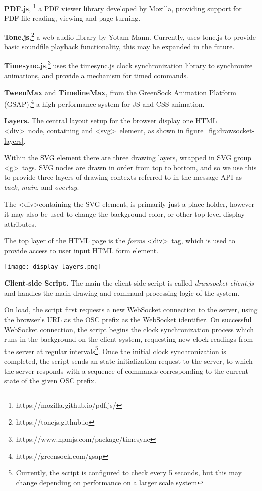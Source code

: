 \textbf{PDF.js}, \footnote{https://mozilla.github.io/pdf.js/} a PDF viewer library developed by Mozilla, providing support for PDF file reading, viewing and page turning.

\textbf{Tone.js},\footnote{https://tonejs.github.io} a web-audio library by Yotam Mann. Currently, \drawsocket uses tone.js to provide basic soundfile playback functionality, this may be expanded in the future.

\textbf{Timesync.js},\footnote{https://www.npmjs.com/package/timesync} \drawsocket uses the timesync.js clock synchronization library to synchronize animations, and provide a mechanism for timed commands.

 \textbf{TweenMax} and \textbf{TimelineMax}, from the GreenSock Animation Platform (GSAP),\footnote{https://greensock.com/gsap} a high-performance system for JS and CSS animation.

\medskip
\noindent
\textbf{Layers.}
The central layout setup for the browser display one HTML  \textless div\textgreater\ node, containing and \textless svg\textgreater\ element, as shown in figure~\ref{fig:drawsocket-layers}.

Within the SVG element there are three drawing layers, wrapped in SVG group \textless g\textgreater\ tags.
SVG nodes are drawn in order from top to bottom, and so we use this to provide three layers of drawing contexts referred to in the message API as \textit{back}, \textit{main}, and \textit{overlay}.

The \textless div\textgreater containing the SVG element, is primarily just a place holder, however it may also be used to change the background color, or other top level display attributes.

The top layer of the HTML page is the \textit{forms} \textless div\textgreater\ tag, which is used to provide access to user input HTML form element.

\begin{figure*}[]
\centering
\texttt{[image: display-layers.png]}
\caption{\drawsocket display layers. 
\label{fig:drawsocket-layers}}
\end{figure*}

\medskip
\noindent
\textbf{Client-side Script.} 
The main the client-side script is called \textit{drawsocket-client.js} and handles the main drawing and command processing logic of the system.

On load, the script first requests a new WebSocket connection to the server, using the browser's URL as the OSC prefix as the WebSocket identifier. On successful WebSocket connection, the script begins the clock synchronization process which runs in the background on the client system, requesting new clock readings from the server at regular intervals\footnote{Currently, the script is configured to check every 5 seconds, but this may change depending on performance on a larger scale system}. Once the initial clock synchronization is completed, the script sends an state initialization request to the server, to which the server responds with a sequence of commands corresponding to the current state of the given OSC prefix.

